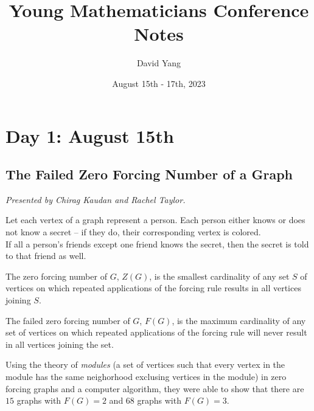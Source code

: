 \documentclass[12pt]{amsart}
\title{Young Mathematicians Conference Notes}
\author{David Yang}
\date{August 15th - 17th, 2023}
\begin{document}
\maketitle

\section{Day 1: August 15th}

\vspace{0.25cm}

\subsection{The Failed Zero Forcing Number of a Graph}

\textit{}
\vspace{0.25cm}

\textit{Presented by Chirag Kaudan and Rachel Taylor.}

\begin{definition}
Let each vertex of a graph represent a person. Each person either knows or does not know a secret -- if they do, their corresponding vertex is colored. \\

If all a person's friends except one friend knows the secret, then the secret is told to that friend as well.\end{definition}

\begin{definition}
The zero forcing number of $G$, $Z(G)$, is the smallest cardinality of any set $S$ of vertices on which repeated applications of the forcing rule
results in all vertices joining $S$.
\end{definition}

\begin{definition}
The failed zero forcing number of $G$, $F(G)$, is the maximum
cardinality of any set of vertices on which repeated applications of the forcing rule will never result in all vertices joining the set.\end{definition}

\begin{result}
Using the theory of \textit{modules} (a set of vertices such that every vertex in the module has the same neighorhood exclusing vertices in the module) in zero forcing graphs and a computer algorithm, they were able to show that
there are $15$ graphs with $F(G) = 2$ and $68$ graphs with $F(G) = 3$. 
\end{result}
\end{document}

